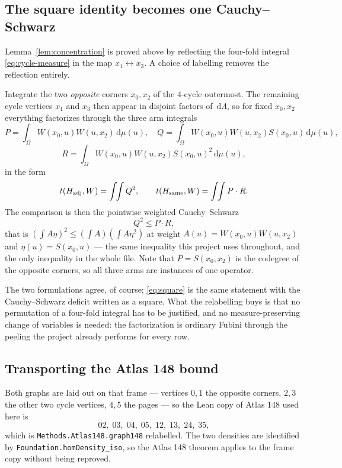 \documentclass[11pt]{article}
\newcommand{\dd}{\,\mathrm d}
\begin{document}
\subsection{The square identity becomes one Cauchy--Schwarz}
\label{sec:app145-cs}

Lemma~\ref{lem:concentration} is proved above by reflecting the four-fold
integral \eqref{eq:cycle-measure} in the map $x_1\leftrightarrow x_3$.  A
choice of labelling removes the reflection entirely.

Integrate the two \emph{opposite} corners $x_0,x_2$ of the $4$-cycle
outermost.  The remaining cycle vertices $x_1$ and $x_3$ then appear in
disjoint factors of $\dd\Lambda$, so for fixed $x_0,x_2$ everything
factorizes through the three arm integrals
\[
 P=\int_\Omega W(x_0,u)W(u,x_2)\dd\mu(u),\quad
 Q=\int_\Omega W(x_0,u)W(u,x_2)S(x_0,u)\dd\mu(u),
\]
\[
 R=\int_\Omega W(x_0,u)W(u,x_2)S(x_0,u)^2\dd\mu(u),
\]
in the form
\[
 t(H_{\rm adj},W)=\int\!\!\int Q^2,
 \qquad
 t(H_{\rm same},W)=\int\!\!\int P\cdot R .
\]
The comparison is then the pointwise weighted Cauchy--Schwarz
\[
 Q^2\leq P\cdot R,
\]
that is $(\int A\eta)^2\leq(\int A)(\int A\eta^2)$ at weight
$A(u)=W(x_0,u)W(u,x_2)$ and $\eta(u)=S(x_0,u)$ --- the same inequality this
project uses throughout, and the only inequality in the whole file.  Note that
$P=S(x_0,x_2)$ is the codegree of the opposite corners, so all three arms are
instances of one operator.

The two formulations agree, of course; \eqref{eq:square} is the same
statement with the Cauchy--Schwarz deficit written as a square.  What the
relabelling buys is that no permutation of a four-fold integral has to be
justified, and no measure-preserving change of variables is needed: the
factorization is ordinary Fubini through the peeling the project already
performs for every row.

\subsection{Transporting the Atlas 148 bound}
\label{sec:app145-transport}

Both graphs are laid out on that frame --- vertices $0,1$ the opposite
corners, $2,3$ the other two cycle vertices, $4,5$ the pages --- so the Lean
copy of Atlas 148 used here is
\[
 02,\;03,\;04,\;05,\;12,\;13,\;24,\;35,
\]
which is \texttt{Methods.Atlas148.graph148} relabelled.  The two densities are
identified by \texttt{Foundation.homDensity\_iso}, so the Atlas 148 theorem
applies to the frame copy without being reproved.
\end{document}
